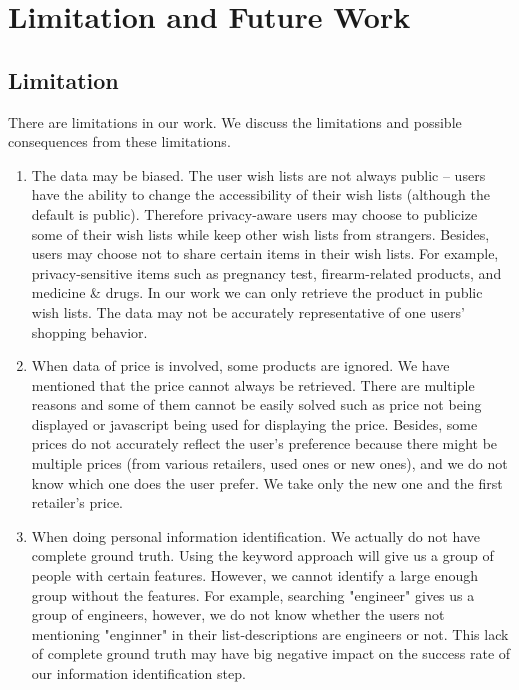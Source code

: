 \documentclass{llncs}
\begin{document}
\section{Limitation and Future Work}
\subsection{Limitation}
There are limitations in our work. We discuss the limitations and possible consequences from these limitations. 
\begin{enumerate}
\item The data may be biased. The user wish lists are not always public -- users have the ability to change the accessibility of their wish lists (although the default is public). Therefore privacy-aware users may choose to publicize some of their wish lists while keep other wish lists from strangers. Besides, users may choose not to share certain items in their wish lists. For example, privacy-sensitive items such as pregnancy test, firearm-related products, and medicine \& drugs. In our work we can only retrieve the product in public wish lists. The data may not be accurately representative of one users' shopping behavior.

\item When data of price is involved, some products are ignored. We have mentioned that the price cannot always be retrieved. There are multiple reasons and some of them cannot be easily solved such as price not being displayed or javascript being used for displaying the price. Besides, some prices do not accurately reflect the user's preference because there might be multiple prices (from various retailers, used ones or new ones), and we do not know which one does the user prefer. We take only the new one and the first retailer's price. 

\item When doing personal information identification. We actually do not have complete ground truth. Using the keyword approach will give us a group of people with certain features. However, we cannot identify a large enough group without the features. For example, searching "engineer" gives us a group of engineers, however, we do not know whether the users not mentioning "enginner" in their list-descriptions are engineers or not. This lack of complete ground truth may have big negative impact on the success rate of our information identification step.

\end{enumerate}
\end{document}
